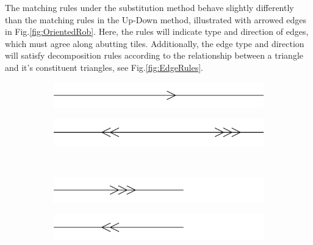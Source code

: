 \documentclass[
  oneside,
  11pt, a4paper,
  footinclude=true,
  headinclude=true,
  cleardoublepage=empty
]{scrbook}
\begin{document}
The matching rules under the substitution method behave slightly differently than the matching rules in the Up-Down method, illustrated with arrowed edges in Fig.\ref{fig:OrientedRob}. Here, the rules will indicate type and direction of edges, which must agree along abutting tiles. Additionally, the edge type and direction will satisfy decomposition rules according to the relationship between a triangle and it's constituent triangles, see Fig.\ref{fig:EdgeRules}. 

\begin{figure}[H]
        \begin{subfigure}[t]{0.4\textwidth}
                \includegraphics[width=\textwidth]{a1}
        \end{subfigure}\hfill
        \begin{subfigure}[t]{0.4\textwidth}
                \includegraphics[width=\textwidth]{a1inflate}
        \end{subfigure}\\
        
        \begin{subfigure}[t]{0.4\textwidth}
                \includegraphics[width=\textwidth]{a2}
        \end{subfigure}\hfill
        \begin{subfigure}[t]{0.4\textwidth}
                \includegraphics[width=\textwidth]{a2inflate}
        \end{subfigure}\\    
        

\end{figure}
\end{document}
